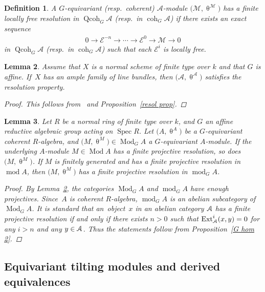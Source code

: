 \documentclass[11pt]{article}
\numberwithin{equation}{section}
\newtheorem{dfn}{Definition}[section]
\newtheorem{lem}[dfn]{Lemma}
\numberwithin{equation}{section}
\newcommand{\Spec}{\operatorname{Spec}}
\newcommand{\Ext}{\operatorname{Ext}}
\newcommand{\coh}{\operatorname{coh}}
\newcommand{\Qcoh}{\operatorname{Qcoh}}
\newcommand{\Mod}{\operatorname{Mod}}
\newcommand{\fmod}{\operatorname{mod}}
\newcommand{\cA}{\mathcal{A}}
\newcommand{\cE}{\mathcal{E}}
\newcommand{\cM}{\mathcal{M}}
\newcommand{\scrA}{\EuScript{A}}
\begin{document}
\begin{dfn}
A $G$-equivariant (resp.\ coherent) $\cA$-module $\big(\cM,\uptheta^{\cM}\big)$ has a {\it finite locally free resolution} in $\Qcoh_G\cA$ (resp.\ in $\coh_G\cA$) if there exists an exact sequence
\begin{gather*}
0\to \cE^{-n}\to\cdots\to\cE^0\to \cM\to0
\end{gather*}
in $\Qcoh_G\cA$ (resp.\ in $\coh_G\cA$) such that each $\cE^i$ is locally free.
\end{dfn}


\begin{lem}\label{enough proj}
Assume that $X$ is a normal scheme of finite type over $k$ and that $G$ is affine.
If~$X$ has an ample family of line bundles, then $\big(\cA,\uptheta^{\cA}\big)$ satisfies the resolution property.
\begin{proof}
This follows from~\cite[Theorem~2.29]{bfk} and Proposition~\ref{resol prop}.
\end{proof}
\end{lem}

\begin{lem}\label{finite proj resol}
Let $R$ be a normal ring of finite type over $k$, and $G$ an affine reductive algebraic group acting on $\Spec R$. Let $\big(A,\uptheta^{A}\big)$ be a $G$-equivariant coherent $R$-algebra, and $\big(M,\uptheta^M\big)\in \Mod_GA$ a $G$-equivariant $A$-module. If the underlying $A$-module $M\in \Mod A$ has a finite projective resolution, so does $\big(M,\uptheta^M\big)$. If $M$ is finitely generated and has a finite projective resolution in $\fmod A$, then $\big(M,\uptheta^M\big)$ has a finite projective resolution in $\fmod_GA$.
\begin{proof}
By Lemma~\ref{enough proj}, the categories $\Mod_GA$ and $\fmod_GA$ have enough projectives. Since~$A$ is coherent $R$-algebra, $\fmod_GA$ is an abelian subcategory of $\Mod_GA$. It is standard that an~object~$x$ in an abelian category $\scrA$ has a finite projective resolution if and only if there exists $n>0$ such that $\Ext_{\scrA}^i(x,y)=0$ for any $i>n$ and any $y\in \scrA$. Thus the statements follow from Proposition~\ref{G hom 2}.
\end{proof}
\end{lem}

\subsection{Equivariant tilting modules and derived equivalences}\label{derived section}
\end{document}
